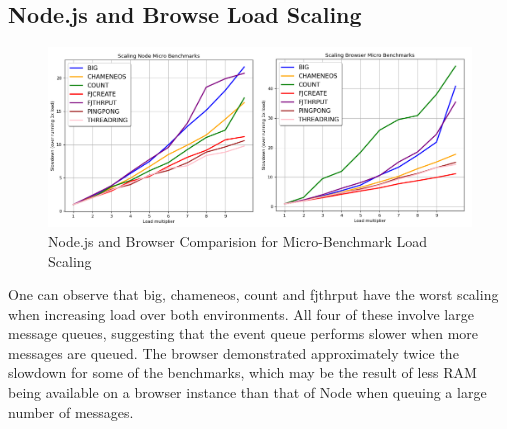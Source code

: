 \documentclass[12pt, a4paper]{report}
\theoremstyle{definition}
\theoremstyle{definition}%
\theoremstyle{definition}%
\theoremstyle{definition}%
\theoremstyle{definition}%
\theoremstyle{definition}%
\begin{document}
\subsection{Node.js and Browse Load Scaling}
\begin{figure}[H]
    \begin{centering}
        \includegraphics[width=\textwidth]{resources/load_scaling.png}
        \caption{Node.js and Browser Comparision for Micro-Benchmark Load Scaling}
    \end{centering}
\end{figure}
One can observe that big, chameneos, count and fjthrput have the worst scaling when increasing load over both environments. All four of these involve large message queues, suggesting that the event queue performs slower when more messages are queued. The browser demonstrated approximately twice the slowdown for some of the benchmarks, which may be the result of less RAM being available on a browser instance than that of Node when queuing a large number of messages.
\end{document}
